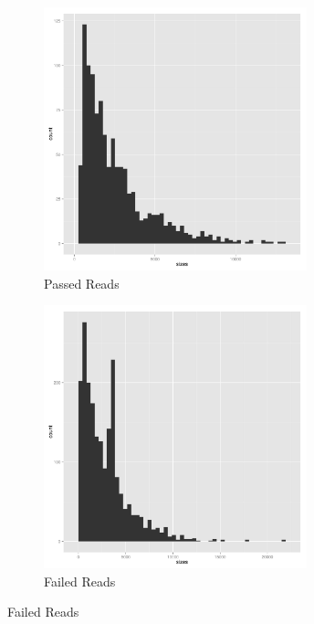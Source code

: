 \begin{figure}[h!]
  \begin{subfigure}[b]{0.45\textwidth}
    \includegraphics[width=3in]{histallpass}
    \caption{Passed Reads}
  \end{subfigure}
  \begin{subfigure}[b]{0.45\textwidth}
    \includegraphics[width=3in]{histallfail}
    \caption{Failed Reads}
  \end{subfigure}
\end{figure}
